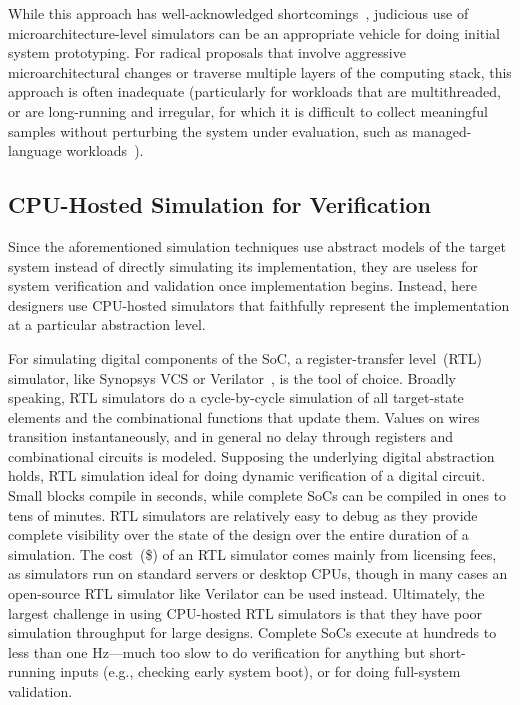 While this approach has well-acknowledged shortcomings~\cite{gem5error},
judicious use of microarchitecture-level simulators can be an appropriate vehicle for
doing initial system prototyping. For radical proposals that involve
aggressive microarchitectural changes or traverse multiple layers of the
computing stack, this approach is often inadequate (particularly for workloads that
are multithreaded, or are long-running and irregular, for which it is difficult to collect 
meaningful samples without perturbing the system under evaluation, such as
managed-language workloads~\cite{MicroSimPanel}).


\subsection{CPU-Hosted Simulation for Verification}

Since the aforementioned simulation techniques use abstract models of the
target system instead of directly simulating its implementation, they are useless for system verification and validation once
implementation begins. Instead, here designers use CPU-hosted
simulators that faithfully represent the implementation at a particular
abstraction level.

For simulating digital components of the SoC, a register-transfer level~(RTL) simulator,
like Synopsys VCS or Verilator~\cite{Verilator}, is the tool of choice. Broadly speaking, RTL
simulators do a cycle-by-cycle simulation of all target-state elements and the combinational functions that update
them. Values on wires transition instantaneously, and in
general no delay through registers and combinational circuits is
modeled. Supposing the underlying digital abstraction holds, RTL simulation
ideal for doing dynamic verification of a digital circuit. Small blocks compile
in seconds, while complete SoCs can be compiled in ones to tens of minutes. RTL
simulators are relatively easy to debug as they provide complete visibility
over the state of the design over the entire duration of a simulation. The
cost~(\$) of an RTL simulator comes mainly from licensing fees, as simulators
run on standard servers or desktop CPUs, though in many cases an open-source RTL simulator
like Verilator can be used instead. Ultimately, the largest challenge in using
CPU-hosted RTL simulators is that they have poor simulation throughput for large
designs. Complete SoCs execute at hundreds to less than one Hz---much too slow
to do verification for anything but short-running inputs (e.g., checking early system boot), or
for doing full-system validation.

